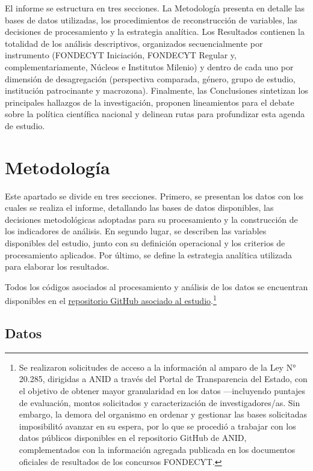 \documentclass[
  spanish,
  a4paper,
  oneside]{scrbook}
\begin{document}
El informe se estructura en tres secciones. La Metodología presenta en
detalle las bases de datos utilizadas, los procedimientos de
reconstrucción de variables, las decisiones de procesamiento y la
estrategia analítica. Los Resultados contienen la totalidad de los
análisis descriptivos, organizados secuencialmente por instrumento
(FONDECYT Iniciación, FONDECYT Regular y, complementariamente, Núcleos e
Institutos Milenio) y dentro de cada uno por dimensión de desagregación
(perspectiva comparada, género, grupo de estudio, institución
patrocinante y macrozona). Finalmente, las Conclusiones sintetizan los
principales hallazgos de la investigación, proponen lineamientos para el
debate sobre la política científica nacional y delinean rutas para
profundizar esta agenda de estudio.


\chapter{Metodología}\label{metodologuxeda}

Este apartado se divide en tres secciones. Primero, se presentan los
datos con los cuales se realiza el informe, detallando las bases de
datos disponibles, las decisiones metodológicas adoptadas para su
procesamiento y la construcción de los indicadores de análisis. En
segundo lugar, se describen las variables disponibles del estudio, junto
con su definición operacional y los criterios de procesamiento
aplicados. Por último, se define la estrategia analítica utilizada para
elaborar los resultados.

Todos los códigos asociados al procesamiento y análisis de los datos se
encuentran disponibles en el
\href{https://github.com/renejcanales/fondos-css}{repositorio GitHub
asociado al estudio}.\footnote{Se realizaron solicitudes de acceso a la
  información al amparo de la Ley N° 20.285, dirigidas a ANID a través
  del Portal de Transparencia del Estado, con el objetivo de obtener
  mayor granularidad en los datos ---incluyendo puntajes de evaluación,
  montos solicitados y caracterización de investigadores/as. Sin
  embargo, la demora del organismo en ordenar y gestionar las bases
  solicitadas imposibilitó avanzar en su espera, por lo que se procedió
  a trabajar con los datos públicos disponibles en el repositorio GitHub
  de ANID, complementados con la información agregada publicada en los
  documentos oficiales de resultados de los concursos FONDECYT.}

\section{Datos}\label{datos}
\end{document}

